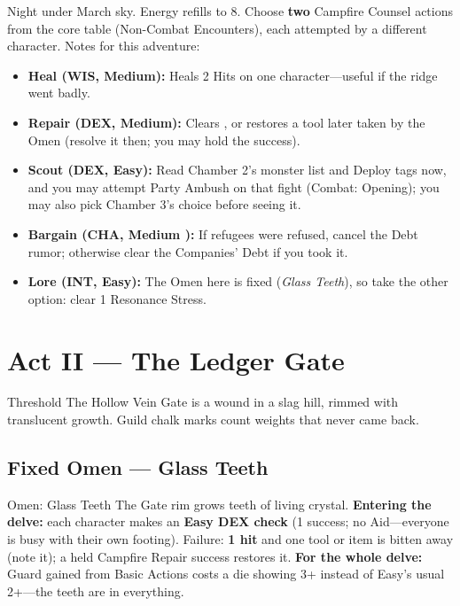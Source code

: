Night under March sky. Energy refills to 8. Choose \textbf{two} Campfire Counsel actions from the core table (Non-Combat Encounters), each attempted by a different character. Notes for this adventure:
\begin{itemize}
    \item \textbf{Heal (WIS, Medium):} Heals 2 Hits on one character---useful if the ridge went badly.
    \item \textbf{Repair (DEX, Medium):} Clears , or restores a tool later taken by the Omen (resolve it then; you may hold the success).
    \item \textbf{Scout (DEX, Easy):} Read Chamber 2's monster list and Deploy tags now, and you may attempt Party Ambush on that fight (Combat: Opening); you may also pick Chamber 3's choice before seeing it.
    \item \textbf{Bargain (CHA, Medium ):} If refugees were refused, cancel the Debt rumor; otherwise clear the Companies' Debt if you took it.
    \item \textbf{Lore (INT, Easy):} The Omen here is fixed (\textit{Glass Teeth}), so take the other option: clear 1 Resonance Stress.
\end{itemize}

\section{Act II --- The Ledger Gate}

\begin{rpgbox}{Threshold}
    The Hollow Vein Gate is a wound in a slag hill, rimmed with translucent growth.
    Guild chalk marks count weights that never came back.
\end{rpgbox}

\subsection{Fixed Omen --- Glass Teeth}

\begin{hazardbox}{Omen: Glass Teeth}
    The Gate rim grows teeth of living crystal.
    \textbf{Entering the delve:} each character makes an \textbf{Easy DEX check} (1 success; no Aid---everyone is busy with their own footing). Failure: \textbf{1 hit} and one tool or item is bitten away (note it); a held Campfire Repair success restores it.
    \textbf{For the whole delve:} Guard gained from Basic Actions costs a die showing 3+ instead of Easy's usual 2+---the teeth are in everything.
\end{hazardbox}

